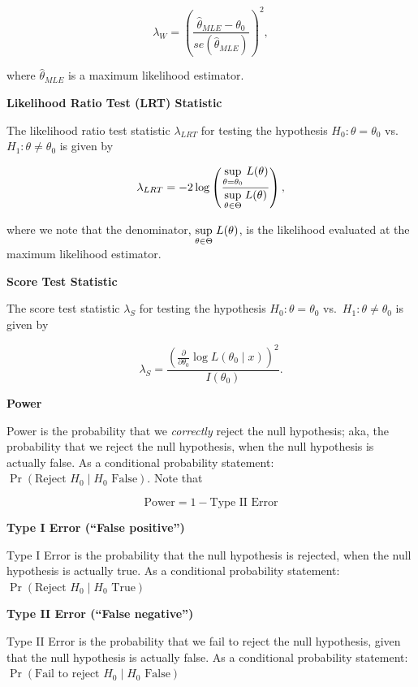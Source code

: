 \documentclass[
  letterpaper,
  DIV=11,
  numbers=noendperiod]{scrreprt}
\begin{document}
\[
\lambda_W = \left(\frac{\hat{\theta}_{MLE} - \theta_0}{se(\hat{\theta}_{MLE})}\right)^2,
\]

where \(\hat{\theta}_{MLE}\) is a maximum likelihood estimator.

\textbf{Likelihood Ratio Test (LRT) Statistic}

The likelihood ratio test statistic \(\lambda_{LRT}\) for testing the
hypothesis \(H_0: \theta = \theta_0\) vs.~\(H_1: \theta \neq \theta_0\)
is given by

\[
\lambda_{LRT} = -2 \log\left(\frac{\underset{\theta = \theta_0}{\text{sup}} \hspace{1mm} L(\theta)}{\underset{\theta \in \Theta}{\text{sup}} \hspace{1mm} L(\theta)}\right),
\]

where we note that the denominator,
\(\underset{\theta \in \Theta}{\text{sup}} \hspace{1mm} L(\theta)\), is
the likelihood evaluated at the maximum likelihood estimator.

\textbf{Score Test Statistic}

The score test statistic \(\lambda_S\) for testing the hypothesis
\(H_0: \theta = \theta_0\) vs.~\(H_1: \theta \neq \theta_0\) is given by

\[
\lambda_S = \frac{\left( \frac{\partial}{\partial \theta_0} \log L(\theta_0 \mid x) \right)^2}{I(\theta_0)}.
\]

\textbf{Power}

Power is the probability that we \emph{correctly} reject the null
hypothesis; aka, the probability that we reject the null hypothesis,
when the null hypothesis is actually false. As a conditional probability
statement: \(\Pr(\text{Reject }H_0 \mid H_0 \text{ False})\). Note that

\[
\text{Power} = 1 - \text{Type II Error}
\]

\textbf{Type I Error (``False positive'')}

Type I Error is the probability that the null hypothesis is rejected,
when the null hypothesis is actually true. As a conditional probability
statement: \(\Pr(\text{Reject }H_0 \mid H_0 \text{ True})\)

\textbf{Type II Error (``False negative'')}

Type II Error is the probability that we fail to reject the null
hypothesis, given that the null hypothesis is actually false. As a
conditional probability statement:
\(\Pr(\text{Fail to reject }H_0 \mid H_0 \text{ False})\)
\end{document}
